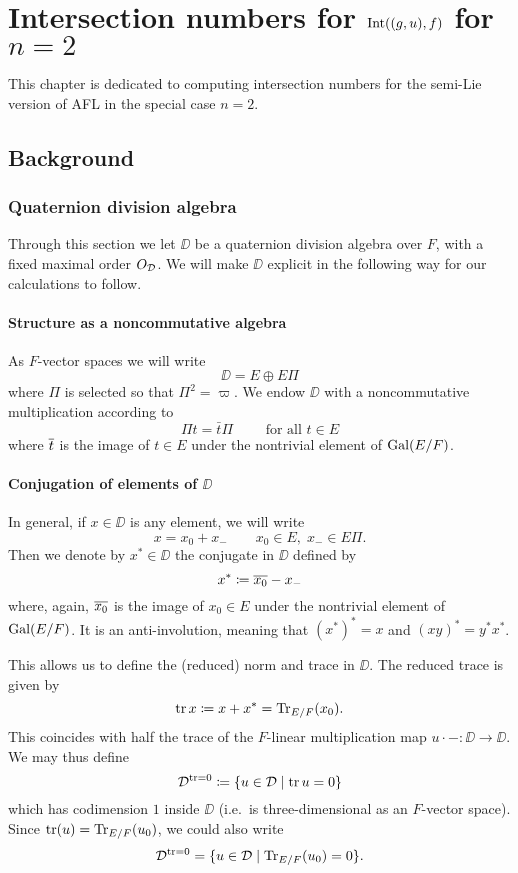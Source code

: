 \chapter{Intersection numbers for $\operatorname{Int}((g,u), f)$ for $n = 2$}
This chapter is dedicated to computing intersection numbers
for the semi-Lie version of AFL in the special case $n = 2$.

\section{Background}
\subsection{Quaternion division algebra}
Through this section we let $\DD$ be a quaternion division algebra over $F$,
with a fixed maximal order $O_\mathcal D$.
We will make $\DD$ explicit in the following way for our calculations to follow.

\subsubsection{Structure as a noncommutative algebra}
As $F$-vector spaces we will write
\[ \DD = E \oplus E \Pi \]
where $\Pi$ is selected so that $\Pi^2 = \varpi$.
We endow $\DD$ with a noncommutative multiplication according to
\[ \Pi t = \bar t \Pi \qquad \text{ for all } t \in E \]
where $\overline{t}$ is the image of $t \in E$ under the nontrivial element of $\operatorname{Gal}(E/F)$.

\subsubsection{Conjugation of elements of $\DD$}
In general, if $x \in \DD$ is any element, we will write
\[ x = x_0 + x_- \qquad x_0 \in E, \; x_- \in E \Pi. \]
Then we denote by $x^\ast \in \DD$ the conjugate in $\DD$ defined by
\[ x^\ast \coloneqq \overline{x_0} - x_- \]
where, again, $\overline{x_0}$ is the image of $x_0 \in E$ under the nontrivial element of $\operatorname{Gal}(E/F)$.
It is an anti-involution, meaning that $(x^\ast)^\ast = x$ and $(xy)^\ast = y^\ast x^\ast$.

This allows us to define the (reduced) norm and trace in $\DD$.
The reduced trace is given by
\[ \operatorname{tr} x \coloneqq x + x^\ast = \operatorname{Tr}_{E/F}(x_0). \]
This coincides with half the trace of the
$F$-linear multiplication map $u \cdot - \colon \DD \to \DD$.
We may thus define
\[ \mathcal D^{\operatorname{tr} = 0} \coloneqq \left\{ u \in \mathcal D \mid \operatorname{tr} u = 0 \right\} \]
which has codimension $1$ inside $\DD$ (i.e.\ is three-dimensional as an $F$-vector space).
Since $\operatorname{tr}(u) = \operatorname{Tr}_{E/F}(u_0)$,
we could also write
\[ \mathcal D^{\operatorname{tr} = 0} = \{ u \in \mathcal D \mid \operatorname{Tr}_{E/F}(u_0) = 0 \}. \]

